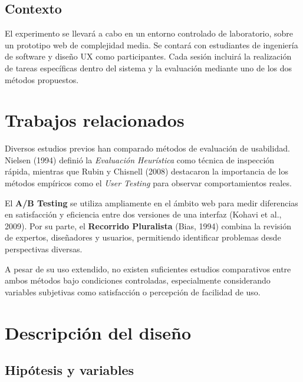 \documentclass[a4paper,12pt]{report}
\begin{document}
\section{Contexto}
El experimento se llevará a cabo en un entorno controlado de laboratorio, sobre un prototipo web de complejidad media. Se contará con estudiantes de ingeniería de software y diseño UX como participantes. Cada sesión incluirá la realización de tareas específicas dentro del sistema y la evaluación mediante uno de los dos métodos propuestos.

\chapter{Trabajos relacionados}

Diversos estudios previos han comparado métodos de evaluación de usabilidad. Nielsen (1994) definió la \textit{Evaluación Heurística} como técnica de inspección rápida, mientras que Rubin y Chisnell (2008) destacaron la importancia de los métodos empíricos como el \textit{User Testing} para observar comportamientos reales.  

El \textbf{A/B Testing} se utiliza ampliamente en el ámbito web para medir diferencias en satisfacción y eficiencia entre dos versiones de una interfaz (Kohavi et al., 2009). Por su parte, el \textbf{Recorrido Pluralista} (Bias, 1994) combina la revisión de expertos, diseñadores y usuarios, permitiendo identificar problemas desde perspectivas diversas.

A pesar de su uso extendido, no existen suficientes estudios comparativos entre ambos métodos bajo condiciones controladas, especialmente considerando variables subjetivas como satisfacción o percepción de facilidad de uso.

\chapter{Descripción del diseño}

\section{Hipótesis y variables}
\end{document}
